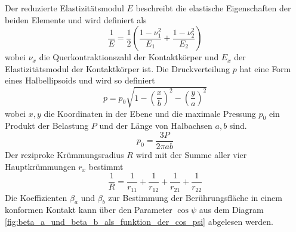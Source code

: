 %
Der reduzierte Elastizitätsmodul $E$ beschreibt die elastische Eigenschaften der beiden Elemente und wird definiert als
\begin{equation}
    \label{eq:reduzierter_elastizitaetsmodul}
    \frac{1}{E} = \frac{1}{2}  \left( \frac{1 - \nu_1^2}{E_1} + \frac{1 - \nu_2^2}{E_2} \right)
\end{equation}
%
wobei $\nu_x$ die Querkontraktionszahl der Kontaktkörper und $E_x$ der Elastizitätsmodul der Kontaktkörper ist.
Die Druckverteilung $p$ hat eine Form eines Halbellipsoids und wird so definiert
\begin{equation}
    \label{eq:druckverteilung}
    p = p_0  \sqrt{1 - \left( \frac{x}{b} \right)^2 - \left( \frac{y}{a} \right)^2}
\end{equation}
%
wobei $x, y$ die Koordinaten in der Ebene und die maximale Pressung $p_0$ ein Produkt der Belastung $P$ und der Länge von Halbachsen $a, b$ sind.
\begin{equation}
    \label{eq:maximale_pressung}
    p_0 = \frac{3  P}{2  \pi  a  b}
\end{equation}
%
Der reziproke Krümmungsradius $R$ wird mit der Summe aller vier Hauptkrümmungen $r_x$ bestimmt
\begin{equation}
    \label{eq:kruemmungsradius}
    \frac{1}{R} = \frac{1}{r_{11}} + \frac{1}{r_{12}} + \frac{1}{r_{21}} + \frac{1}{r_{22}}
\end{equation}
%
Die Koeffizienten $\beta_a$ und $\beta_b$ zur Bestimmung der Berührungsfläche in einem konformen Kontakt kann über den Parameter $\cos{\psi}$ aus dem Diagram \ref{fig:beta_a_und_beta_b_als_funktion_der_cos_psi} abgelesen werden.
